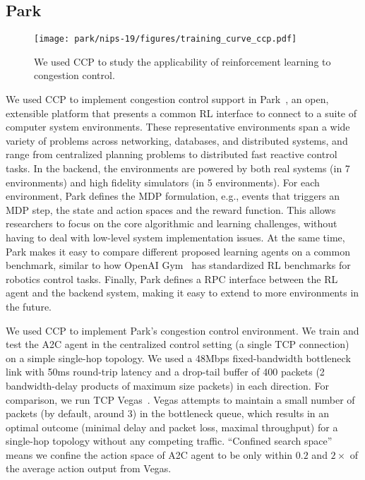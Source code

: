 \subsection{Park}
\label{s:capabilities:park}

\begin{figure}
\texttt{[image: park/nips-19/figures/training\_curve\_ccp.pdf]}
\caption{We used CCP to study the applicability of reinforcement learning to congestion control.}
\label{f:curve_ccp}
\end{figure}

We used CCP to implement congestion control support in Park~\cite{park}, an open, extensible platform that presents a common RL interface to connect to
a suite of computer system environments. 
These representative environments span a wide variety of problems across networking, databases, and distributed systems, and range from centralized planning problems to distributed fast reactive control tasks. In the backend, the environments are powered by both real systems (in 7 environments) and high fidelity simulators (in 5 environments).  
For each environment, Park defines the MDP formulation, e.g., events that triggers an MDP step, the state and action spaces and the reward function.
This allows researchers to focus on
the core algorithmic and learning challenges, without having to deal
with low-level system implementation issues.
At the same time, Park makes it easy to
compare 
different proposed learning agents on a common benchmark, similar to how OpenAI Gym~\cite{openaigym} has standardized RL benchmarks for robotics control tasks.
Finally, Park defines a RPC interface between the RL agent and the backend system, making it easy to extend to more environments in the future. 

We used CCP to implement Park's congestion control environment.
We train and test the A2C agent in the centralized control setting (a single TCP
connection) on a simple single-hop topology. 
%
We used a 48Mbps fixed-bandwidth bottleneck link with 50ms round-trip latency
and a drop-tail buffer of 400 packets (2 bandwidth-delay products of maximum
size packets) in each direction.
For comparison, we run TCP Vegas~\cite{vegas}.
Vegas attempts to maintain a small number
of packets (by default, around 3) in the bottleneck queue, which results in an
optimal outcome (minimal delay and packet loss, maximal throughput) for a
single-hop topology without any competing traffic. 
``Confined search space'' means we confine the action space of A2C agent
to be only within $0.2$ and $2\times$ of the average action output from Vegas. 

